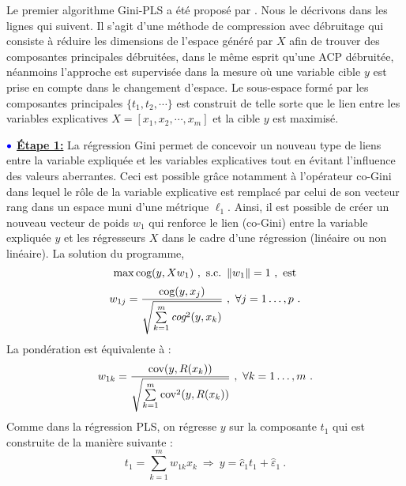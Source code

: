 Le premier algorithme Gini-PLS a été proposé par \citet{mussard2018ginipls}. Nous le décrivons dans les lignes qui suivent. Il s'agit d'une méthode de compression avec débruitage qui consiste à réduire les dimensions de l'espace généré par $X$ afin de trouver des composantes principales débruitées, dans le même esprit qu'une ACP débruitée, néanmoins l'approche est supervisée dans la mesure où une variable cible $y$ est prise en compte dans le changement d'espace. Le sous-espace formé par les composantes principales $\{t_1,t_2,\cdots\}$ est construit de telle sorte que le lien entre les variables explicatives $X = [x_1,x_2,\cdots, x_m]$ et la cible $y$ est maximisé. 

\medskip

$\bulle$ \underline{\textbf{Étape 1:}} La régression Gini permet de concevoir un nouveau type de liens entre la variable expliquée et les variables explicatives tout en évitant l'influence des valeurs aberrantes. Ceci est possible grâce notamment à l'opérateur co-Gini dans lequel le rôle de la variable explicative est remplacé par celui de son vecteur rang dans un espace muni d'une métrique $\ell_1$. Ainsi, il est possible de créer un nouveau vecteur de poids $w_1$ qui renforce le lien (co-Gini) entre la variable expliquée $y$ et les régresseurs $X$ dans le cadre d'une régression (linéaire ou non linéaire).
\newline La solution du programme,
\[
\max \cog(y,X w_1) \ , \ \text{s.c.} \ \left\|w_1\right\|=1 \ , \ \text{est}
\]
\begin{equation}\notag
w_{1j} = \frac{\text{cog}(y,x_j)}{\sqrt{\sum\limits_{k=1}^m \emph{cog}^2(y,x_k)}} \ , \ \forall j = 1\ldots,p \ .
\end{equation}
La pondération est équivalente à :
\begin{equation}\notag
w_{1k} = \frac{\text{cov}(y,R(x_k))}{\sqrt{\sum\limits_{k=1}^m \text{cov}^2(y,R(x_k))}} \ , \ \forall k = 1\ldots,m \ .
\end{equation}
Comme dans la régression PLS, on régresse $y$ sur la composante $t_1$ qui est construite de la manière suivante :
\[
t_1 = \sum_{k=1}^m w_{1k}x_k \ \Longrightarrow \ y = \hat{c}_1 t_1 + \hat{\varepsilon}_1 \ .
\]

\medskip

